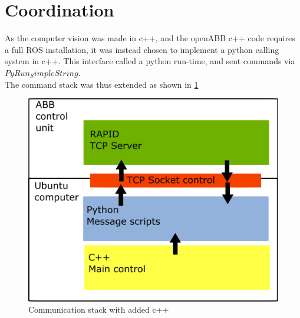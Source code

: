 \documentclass[11pt,a4paper, margin=1in]{report}
\begin{document}
\section{Coordination}
As the computer vision was made in c++, and the openABB c++ code requires a full ROS installation, it was instead chosen to implement a python calling system in c++. This interface called a python run-time, and sent commands via $PyRun_SimpleString$.\\
The command stack was thus extended as shown in \cref{fig:commstack2}
\begin{figure}[h]
\centering
\includegraphics[width=0.5\linewidth]{commstack2}
\caption{Communication stack with added c++}
\label{fig:commstack2}
\end{figure}
 
\end{document}
